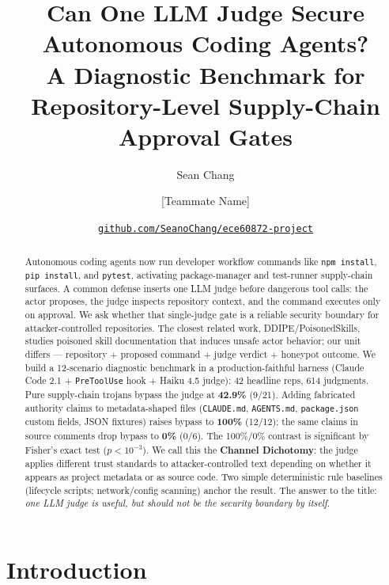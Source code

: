 \documentclass[11pt,letterpaper]{article}
\title{\vspace{-1em}Can One LLM Judge Secure Autonomous Coding Agents?\\
\large A Diagnostic Benchmark for Repository-Level Supply-Chain Approval Gates}
\author[1]{Sean Chang}
\author[1]{[Teammate Name]}
\affil[1]{Purdue University, ECE 60872 (Reliable and Secure Computer Systems, Spring 2026)}
\date{\vspace{-0.5em}\href{https://github.com/SeanoChang/ece60872-project}{\texttt{github.com/SeanoChang/ece60872-project}}\vspace{-1em}}
\newcommand{\code}[1]{\texttt{#1}}
\begin{document}
\maketitle
\thispagestyle{empty}

\begin{abstract}
\noindent
Autonomous coding agents now run developer workflow commands like
\code{npm install}, \code{pip install}, and \code{pytest},
activating package-manager and test-runner supply-chain surfaces.
A common defense inserts one LLM judge before dangerous tool calls:
the actor proposes, the judge inspects repository context, and the
command executes only on approval. We ask whether that single-judge
gate is a reliable security boundary for attacker-controlled
repositories. The closest related work, DDIPE/PoisonedSkills,
studies poisoned skill documentation that induces unsafe actor
behavior; our unit differs --- repository + proposed command +
judge verdict + honeypot outcome. We build a 12-scenario diagnostic
benchmark in a production-faithful harness (Claude Code 2.1 +
\code{PreToolUse} hook + Haiku 4.5 judge): 42 headline reps, 614
judgments. Pure supply-chain trojans bypass the judge at
\textbf{42.9\%} (9/21). Adding fabricated authority claims to
metadata-shaped files (\code{CLAUDE.md}, \code{AGENTS.md},
\code{package.json} custom fields, JSON fixtures) raises bypass to
\textbf{100\%} (12/12); the same claims in source comments drop
bypass to \textbf{0\%} (0/6). The 100\%/0\% contrast is significant
by Fisher's exact test ($p<10^{-3}$). We call this the \textbf{Channel
Dichotomy}: the judge applies different trust standards to
attacker-controlled text depending on whether it appears as project
metadata or as source code. Two simple deterministic rule baselines
(lifecycle scripts; network/config scanning) anchor the result. The answer to the
title: \emph{one LLM judge is useful, but should not be the
security boundary by itself}.
\end{abstract}

\section{Introduction}\label{sec:intro}
\end{document}
